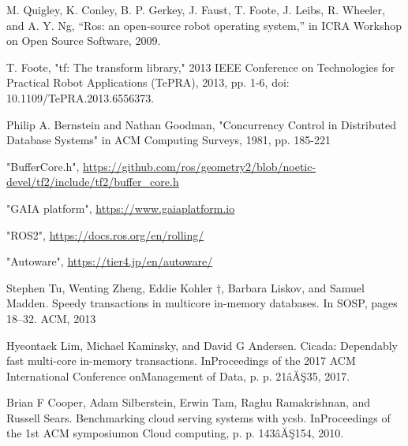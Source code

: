 \documentclass[a4paper]{jreport}	%
\begin{document}
\begin{thebibliography}{99}


 M. Quigley, K. Conley, B. P. Gerkey, J. Faust, T. Foote, J. Leibs, R. Wheeler, and A. Y. Ng, “Ros: an open-source robot operating system,” in ICRA Workshop on Open Source Software, 2009.

 T. Foote, "tf: The transform library," 2013 IEEE Conference on Technologies for Practical Robot Applications (TePRA), 2013, pp. 1-6, doi: 10.1109/TePRA.2013.6556373.

 Philip A. Bernstein and Nathan Goodman, "Concurrency Control in Distributed Database Systems" in ACM Computing Surveys, 1981, pp. 185-221

 "BufferCore.h", \url{https://github.com/ros/geometry2/blob/noetic-devel/tf2/include/tf2/buffer_core.h}

 "GAIA platform", \url{https://www.gaiaplatform.io}

 "ROS2", \url{https://docs.ros.org/en/rolling/}

 "Autoware", \url{https://tier4.jp/en/autoware/}

 Stephen Tu, Wenting Zheng, Eddie Kohler †, Barbara Liskov,
and Samuel Madden. Speedy transactions in multicore in-memory
databases. In SOSP, pages 18–32. ACM, 2013

 Hyeontaek Lim, Michael Kaminsky, and David G Andersen. Cicada: Dependably fast multi-core in-memory transactions. InProceedings of the 2017 ACM International Conference onManagement of Data, p. p. 21âĂŞ35, 2017.

 Brian F Cooper, Adam Silberstein, Erwin Tam, Raghu Ramakrishnan, and Russell Sears. Benchmarking cloud serving systems with ycsb. InProceedings of the 1st ACM symposiumon Cloud computing, p. p. 143âĂŞ154, 2010.

\end{thebibliography}
\end{document}
